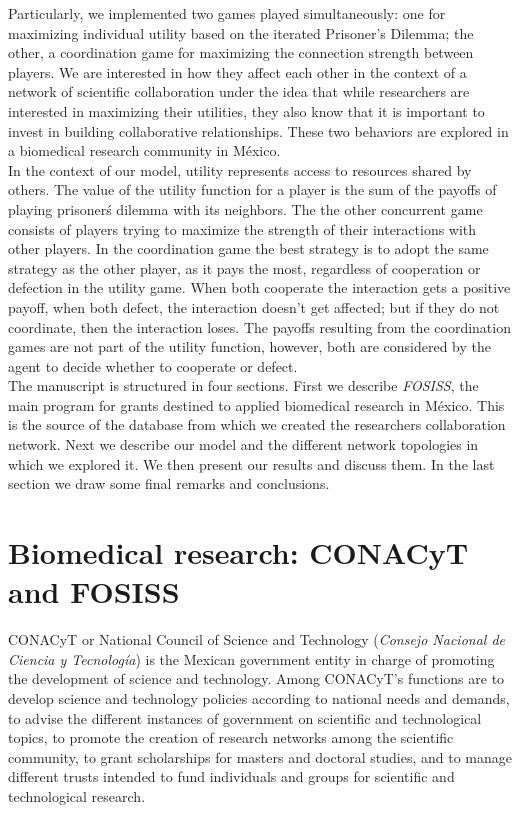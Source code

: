 \documentclass{bmcart}
\begin{document}
   
   Particularly, we implemented two games played simultaneously: 
   one for maximizing individual utility based on the iterated Prisoner's
   Dilemma; the other, a coordination game for maximizing the connection strength between
   players. We are interested in how they affect each other in 
   the context of a network of scientific collaboration under the idea that while
   researchers are interested in maximizing their utilities, they also know that
   it is important to invest in building collaborative relationships. These two
   behaviors are explored in a biomedical research community in M\'exico.\\

In the context of our model, utility represents
  access to resources shared by others.
  The value of the utility function for a player is the sum of the payoffs of playing
  prisoner\'s dilemma with its neighbors. The the other concurrent game consists of players
  trying to maximize the strength of their interactions with other players. In the coordination game the best strategy is to adopt the same strategy as the other player, as it pays the most,
  regardless of cooperation or defection in the utility game. When
  both cooperate the interaction gets a positive payoff, when both defect, the
  interaction doesn't get affected; but if they do not coordinate, then the
  interaction loses. The payoffs resulting from the coordination games are not part of the utility function, however, both are considered by the agent to decide whether to cooperate or defect. \\


The manuscript is structured in four sections. First we describe
\textit{FOSISS}, the main program for grants destined to applied biomedical 
research in M\'exico. This is the source of the
database from which we created the researchers collaboration network. Next we
describe our model
and the different network topologies in which we explored it.
We then present our results and discuss them. In the last section
we draw some final remarks and conclusions.

\section*{Biomedical research: CONACyT and FOSISS}

CONACyT or National Council of Science and Technology (\emph{Consejo
  Nacional de Ciencia y Tecnolog\'ia}) is the Mexican government
entity in charge of promoting the development of science and
technology.  Among CONACyT's functions are to develop science and
technology policies according to national needs and demands, to advise
the different instances of government on scientific and technological
topics, to promote the creation of research networks among the
scientific community, to grant scholarships for masters and doctoral
studies, and to manage different trusts intended to fund individuals
and groups for scientific and
technological research.\\
\end{document}
